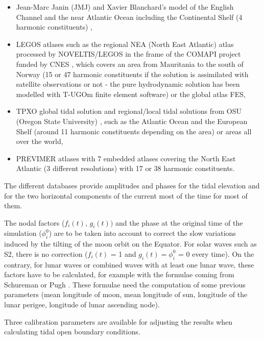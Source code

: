 \begin{itemize}
\item Jean-Marc Janin (JMJ) and Xavier Blanchard's model of the English
Channel and the near Atlantic Ocean including the Continental Shelf (4
harmonic constituents) \cite{jmj},

\item LEGOS atlases such as the regional NEA (North East Atlantic) atlas
processed by NOVELTIS/LEGOS in the frame of the COMAPI project funded by CNES
\cite{pairaud1}, \cite{pairaud2} \cite{legos} which covers an area from
Mauritania to the south of Norway (15 or 47 harmonic constituents if the
solution is assimilated with satellite observations or not - the pure
hydrodynamic solution has been modelled with T-UGOm finite element software)
or the global atlas FES,

\item TPXO global tidal solution and regional/local tidal solutions from OSU
(Oregon State University) \cite{osu}, such as the Atlantic Ocean and the
European Shelf (around 11 harmonic constituents depending on the area) or
areas all over the world,

\item PREVIMER atlases with 7 embedded atlases covering the North East
Atlantic (3 different resolutions) with 17 or 38 harmonic constituents.
\end{itemize}

The different databases provide amplitudes and phases for the tidal elevation
and for the two horizontal components of the current most of the time for most
of them. \newline

The nodal factors ($f_{i}(t)$, $g_{i}(t))$ and the phase at the original time
of the simulation ($\phi_{i}^{0}$) are to be taken into account to correct the
slow variations induced by the tilting of the moon orbit on the Equator.
For solar waves such as S2, there is no correction ($f_{i}(t)$ = 1 and
$g_{i}(t) = \phi_{i}^{0}$ = 0 every time). On the contrary, for lunar waves or
combined waves with at least one lunar wave, these factors have to be
calculated, for example with the formulae coming from Schureman
\cite{schureman71} or Pugh \cite{pugh}. These formulae need the computation of
some previous parameters (mean longitude of moon, mean longitude of sun,
longitude of the lunar perigee, longitude of lunar ascending node).

Three calibration parameters are available for adjusting the results when
calculating tidal open boundary conditions.


